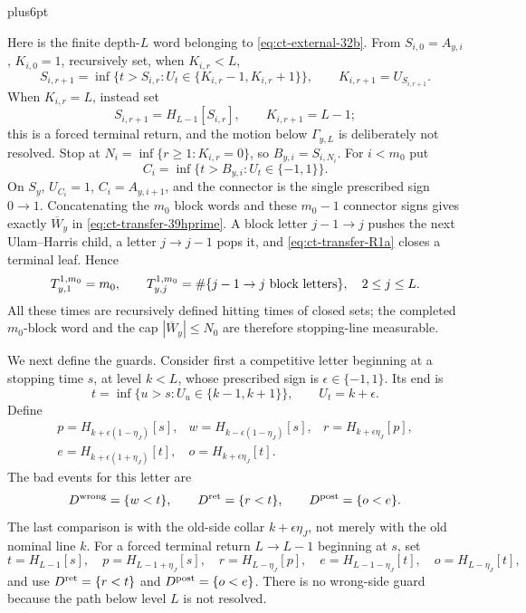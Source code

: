 \documentclass[12pt,reqno]{amsart}
\makeatletter
\theoremstyle{plain}
\theoremstyle{definition}
\theoremstyle{remark}
\renewenvironment{proof}[1][\proofname]{%
  \par
  \pushQED{\qed}%
  \normalfont
  \topsep6pt plus6pt\relax
  \trivlist
  \item[\hskip\labelsep\slshape #1\@addpunct{.}]%
  \ignorespaces
}{%
  \popQED
  \endtrivlist
  \@endpefalse
}
\DeclareRobustCommand{\qed}{%
  \leavevmode\unskip\penalty9999\hbox{}\nobreak
  \ifmmode
    \makebox[0pt][l]{\qquad\hbox{\qedsymbol}}%
  \else
    \qquad\hbox{\qedsymbol}%
  \fi
}
\renewcommand{\qedsymbol}{\rule[.47pt]{4pt}{6pt}}
\numberwithin{equation}{section}
\makeatother
\begin{document}
\begin{proof}[Proof of Lemma~\ref{lem:buffered-transfer}]
Here is the finite depth-$L$ word belonging to \eqref{eq:ct-external-32b}.  From
$S_{i,0}=A_{y,i}$, $K_{i,0}=1$, recursively set, when $K_{i,r}<L$,
\[
S_{i,r+1}=\inf\{t>S_{i,r}:U_t\in
             \{K_{i,r}-1,K_{i,r}+1\}\},\qquad
 K_{i,r+1}=U_{S_{i,r+1}}.
\]
When $K_{i,r}=L$, instead set
\begin{equation}
S_{i,r+1}=H_{L-1}[S_{i,r}],\qquad K_{i,r+1}=L-1;\label{eq:ct-transfer-R1a}
\end{equation}
this is a forced terminal return, and the motion below $\Gamma_{y,L}$
is deliberately not resolved.  Stop at
$N_i=\inf\{r\ge1:K_{i,r}=0\}$, so $B_{y,i}=S_{i,N_i}$.
For $i<m_0$ put
\[
C_i=\inf\{t>B_{y,i}:U_t\in\{-1,1\}\}.
\]
On $S_y$, $U_{C_i}=1$, $C_i=A_{y,i+1}$, and the connector is the
single prescribed sign $0\to1$.  Concatenating the $m_0$ block words
and these $m_0-1$ connector signs gives exactly $\overline W_y$ in
\eqref{eq:ct-transfer-39hprime}.  A block letter $j-1\to j$ pushes the next Ulam--Harris child,
a letter $j\to j-1$ pops it, and \eqref{eq:ct-transfer-R1a} closes a terminal leaf.  Hence
\begin{equation}
T_{y,1}^{1,m_0}=m_0,\qquad
 T_{y,j}^{1,m_0}=\#\{j-1\to j\hbox{ block letters}\},
                  \quad2\le j\le L.\label{eq:ct-transfer-R1b}
\end{equation}
All these times are recursively defined hitting times of closed sets;
the completed $m_0$-block word and the cap $|\overline W_y|\le N_0$
are therefore stopping-line measurable.

We next define the guards.  Consider first a competitive letter beginning
at a stopping time $s$, at level $k<L$, whose prescribed sign is
$\epsilon\in\{-1,1\}$.  Its end is
\[
t=\inf\{u>s:U_u\in\{k-1,k+1\}\},\qquad U_t=k+\epsilon.
\]
Define
\[
\begin{array}{lll}
 p=H_{k+\epsilon(1-\eta_J)}[s],
 &w=H_{k-\epsilon(1-\eta_J)}[s],
 &r=H_{k+\epsilon\eta_J}[p],\\
 e=H_{k+\epsilon(1+\eta_J)}[t],
 &o=H_{k+\epsilon\eta_J}[t].
\end{array}
\]
The bad events for this letter are
\begin{equation}
D^{\rm wrong}=\{w<t\},\qquad
 D^{\rm ret}=\{r<t\},\qquad
 D^{\rm post}=\{o<e\}.\label{eq:ct-transfer-R2}
\end{equation}
The last comparison is with the old-side collar
$k+\epsilon\eta_J$, not merely with the old nominal line $k$.
For a forced terminal return $L\to L-1$ beginning at $s$, set
\[
t=H_{L-1}[s],\quad p=H_{L-1+\eta_J}[s],\quad
 r=H_{L-\eta_J}[p],\quad
 e=H_{L-1-\eta_J}[t],\quad o=H_{L-\eta_J}[t],
\]
and use $D^{\rm ret}=\{r<t\}$ and
$D^{\rm post}=\{o<e\}$.  There is no wrong-side guard because the
path below level $L$ is not resolved.


\end{proof}
\end{document}
